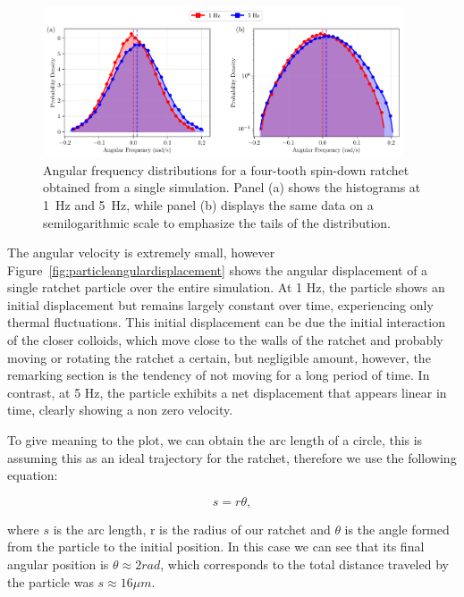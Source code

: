 \begin{figure}[h!]
  \begin{center}
    \includegraphics[width=0.95\textwidth]{figures/histogram_comparison.pdf}
  \end{center}
  \caption[Histogram of angular frequency.]{Angular frequency distributions for a four-tooth spin-down ratchet obtained from a single simulation. Panel (a) shows the histograms at 1~Hz and 5~Hz, while panel (b) displays the same data on a semilogarithmic scale to emphasize the tails of the distribution.}
  \label{fig:histogram}
\end{figure}

The angular velocity is extremely small, however Figure~\ref{fig:particleangulardisplacement} shows the angular displacement of a single ratchet particle over the entire simulation. At 1 Hz, the particle shows an initial displacement but remains largely constant over time, experiencing only thermal fluctuations. This initial displacement can be due the initial interaction of the closer colloids, which move close to the walls of the ratchet and probably moving or rotating the ratchet a certain, but negligible amount, however, the remarking section is the tendency of not moving for a long period of time. In contrast, at 5 Hz, the particle exhibits a net displacement that appears linear in time, clearly showing a non zero velocity.

To give meaning to the plot, we can obtain the arc length of a circle, this is assuming this as an ideal trajectory for the ratchet, therefore we use the following equation:

\begin{equation}
  s = r\theta,
  \label{eq:arclength}
\end{equation}

where $s$ is the arc length, r is the radius of our ratchet and $\theta$ is the angle formed from the particle to the initial position.
In this case we can see that its final angular position is $\theta \approx 2 rad$, which corresponds to the total distance traveled by the particle was $s \approx 16 \mu m$.

